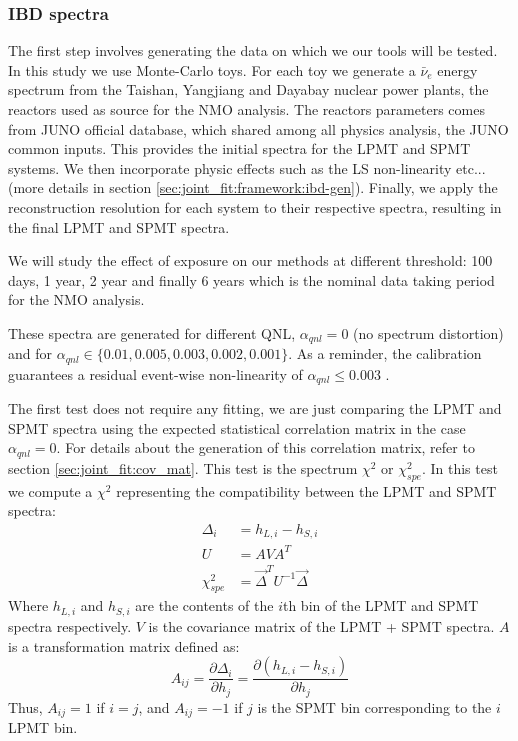\documentclass[../main.tex]{subfiles}
\begin{document}
\subsubsection{IBD spectra}

The first step involves generating the data on which we our tools will be tested. In this study we use Monte-Carlo toys. For each toy we generate a $\bar{\nu}_e$ energy spectrum from the Taishan, Yangjiang and Dayabay nuclear power plants, the reactors used as source for the NMO analysis. The reactors parameters comes from JUNO official database, which shared among all physics analysis, the JUNO common inputs. This provides the initial spectra for the LPMT and SPMT systems. We then incorporate physic effects such as the LS non-linearity etc... (more details in section \ref{sec:joint_fit:framework:ibd-gen}). Finally, we apply the reconstruction resolution for each system to their respective spectra, resulting in the final LPMT and SPMT spectra.

We will study the effect of exposure on our methods at different threshold: 100 days, 1 year, 2 year and finally 6 years which is the nominal data taking period for the NMO analysis.

These spectra are generated for different QNL, $\alpha_{qnl} = 0$ (no spectrum distortion) and for $\alpha_{qnl} \in \{0.01, 0.005, 0.003, 0.002, 0.001\}$. As a reminder, the calibration guarantees a residual event-wise non-linearity of $\alpha_{qnl} \leq 0.003$ \cite{juno_collaboration_calibration_2021}.

The first test does not require any fitting, we are just comparing the LPMT and SPMT spectra using the expected statistical correlation matrix in the case $\alpha_{qnl} = 0$. For details about the generation of this correlation matrix, refer to section \ref{sec:joint_fit:cov_mat}. This test is the spectrum $\chi^2$ or $\chi^2_{spe}$. In this test we compute a $\chi^2$ representing the compatibility between the LPMT and SPMT spectra:
\begin{align}
  \Delta_i &= h_{L,i} - h_{S,i} \\
  U &= A V A^T \\
  \chi^2_{spe} &= \vec{\Delta}^T U^{-1} \vec{\Delta}
\end{align}
Where $h_{L,i}$ and $h_{S,i}$ are the contents of the $i$th bin of the LPMT and SPMT spectra respectively. $V$ is the covariance matrix of the LPMT + SPMT spectra. $A$ is a transformation matrix defined as:
\begin{equation}
  A_{ij} = \frac{\partial \Delta_i}{\partial h_j} = \frac{\partial(h_{L, i} - h_{S, i})}{\partial h_j}
\end{equation}
Thus, $A_{ij} = 1$ if $i = j$, and $A_{ij} = -1$ if $j$ is the SPMT bin corresponding to the $i$ LPMT bin.
\end{document}
